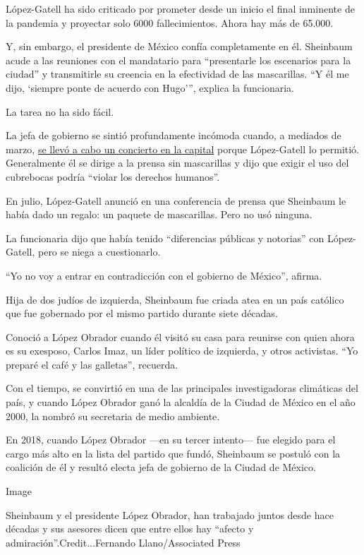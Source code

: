 López-Gatell ha sido criticado por prometer desde un inicio el final
inminente de la pandemia y proyectar solo 6000 fallecimientos. Ahora hay
más de 65.000.

Y, sin embargo, el presidente de México confía completamente en él.
Sheinbaum acude a las reuniones con el mandatario para ``presentarle los
escenarios para la ciudad'' y transmitirle su creencia en la efectividad
de las mascarillas. ``Y él me dijo, `siempre ponte de acuerdo con
Hugo''', explica la funcionaria.

La tarea no ha sido fácil.

La jefa de gobierno se sintió profundamente incómoda cuando, a mediados
de marzo,
\href{https://www.nytimes3xbfgragh.onion/es/2020/03/16/espanol/deportes/mexico-coronavirus-amlo-futbol.html}{se
llevó a cabo un concierto en la capital} porque López-Gatell lo
permitió. Generalmente él se dirige a la prensa sin mascarillas y dijo
que exigir el uso del cubrebocas podría ``violar los derechos humanos''.

En julio, López-Gatell anunció en una conferencia de prensa que
Sheinbaum le había dado un regalo: un paquete de mascarillas. Pero no
usó ninguna.

La funcionaria dijo que había tenido ``diferencias públicas y notorias''
con López-Gatell, pero se niega a cuestionarlo.

``Yo no voy a entrar en contradicción con el gobierno de México'',
afirma.

Hija de dos judíos de izquierda, Sheinbaum fue criada atea en un país
católico que fue gobernado por el mismo partido durante siete décadas.

Conoció a López Obrador cuando él visitó su casa para reunirse con quien
ahora es su exesposo, Carlos Imaz, un líder político de izquierda, y
otros activistas. ``Yo preparé el café y las galletas'', recuerda.

Con el tiempo, se convirtió en una de las principales investigadoras
climáticas del país, y cuando López Obrador ganó la alcaldía de la
Ciudad de México en el año 2000, la nombró su secretaria de medio
ambiente.

En 2018, cuando López Obrador ---en su tercer intento--- fue elegido
para el cargo más alto en la lista del partido que fundó, Sheinbaum se
postuló con la coalición de él y resultó electa jefa de gobierno de la
Ciudad de México.

Image

Sheinbaum y el presidente López Obrador, han trabajado juntos desde hace
décadas y sus asesores dicen que entre ellos hay ``afecto y
admiración''.Credit...Fernando Llano/Associated Press

